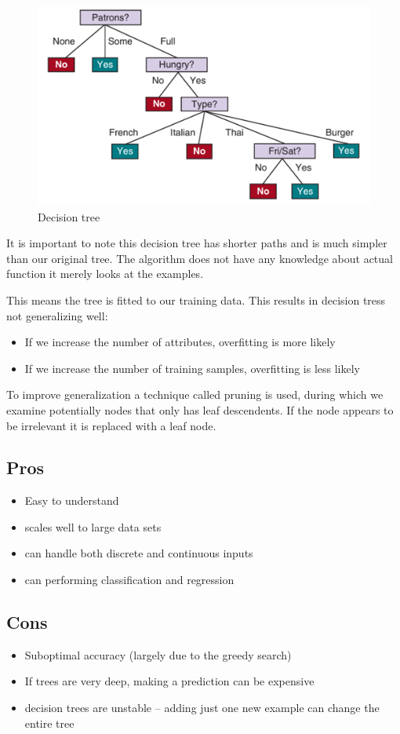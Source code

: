 \documentclass[a4paper,12pt,answers]{article}
\begin{document}
	\begin{figure}[H]
		\centering
		\includegraphics[width=0.7\linewidth]{dec_tree_building2}
		\caption{Decision tree}
		\label{fig:dectreebuilding2}
	\end{figure}
	It is important to note this decision tree has shorter paths and is much simpler than our original tree. The algorithm does not have any knowledge about actual function it merely looks at the examples.
	
	This means the tree is fitted to our training data. This results in decision tress not generalizing well:
	\begin{itemize}
		\item If we increase the number of attributes, overfitting is more likely
		\item If we increase the number of training samples, overfitting is less likely
	\end{itemize}
	
	To improve generalization a technique called pruning is used, during which we examine potentially nodes that only has leaf descendents. If the node appears to be irrelevant it is replaced with a leaf node.
	
	\subsection{Pros}
	\begin{itemize}
		\item Easy to understand
		\item scales well to large data sets
		\item can handle both discrete and continuous inputs
		\item can performing classification and regression
	\end{itemize}
	
	\subsection{Cons}
	\begin{itemize}
		\item Suboptimal accuracy (largely due to the greedy search)
		\item If trees are very deep, making a prediction can be expensive 
		\item decision trees are unstable – adding just one new example can change the entire tree
	\end{itemize}
	
\end{document}
